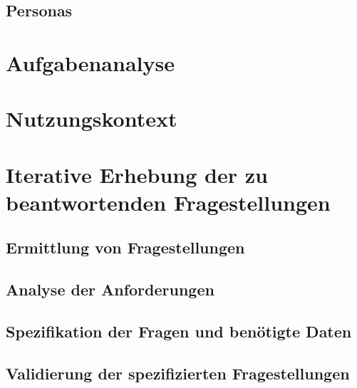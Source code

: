 \subsection{Personas}
\section{Aufgabenanalyse}

\section{Nutzungskontext}

\section{Iterative Erhebung der zu beantwortenden Fragestellungen}
\subsection{Ermittlung von Fragestellungen}
\subsection{Analyse der Anforderungen}
\subsection{Spezifikation der Fragen und benötigte Daten}
\subsection{Validierung der spezifizierten Fragestellungen}